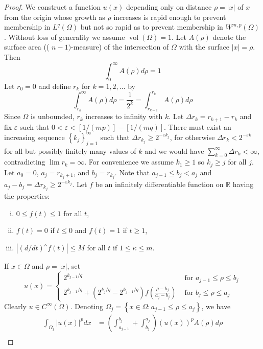 \begin{proof}
  We construct a function $u(x)$ depending only on distance $\rho=|x|$ of $x$ from the origin whose growth as $\rho$ increases is rapid enough to prevent membership in $L^q(\Omega)$ but not so rapid as to prevent membership in $W^{m, p}(\Omega)$.
  Without loss of generality we assume $\operatorname{vol}(\Omega)=1$. Let $A(\rho)$ denote the surface area (( $n-1)$-measure) of the intersection of $\Omega$ with the surface $|x|=\rho$. Then
  \[
  \int_0^{\infty} A(\rho) d \rho=1
  \]
  Let $r_0=0$ and define $r_k$ for $k=1,2, \ldots$ by
  \[
  \int_{r_k}^{\infty} A(\rho) d \rho=\frac{1}{2^k}=\int_{r_{k-1}}^{r_k} A(\rho) d \rho
  \]
  Since $\Omega$ is unbounded, $r_k$ increases to infinity with $k$. Let $\Delta r_k=r_{k+1}-r_k$ and fix $\varepsilon$ such that $0<\varepsilon<[1 /(m p)]-[1 /(m q)]$. There must exist an increasing sequence $\left\{k_j\right\}_{j=1}^{\infty}$ such that $\Delta r_{k_j} \geq 2^{-\varepsilon k_j}$, for otherwise $\Delta r_k<2^{-\varepsilon k}$ for all but possibly finitely many values of $k$ and we would have $\sum_{k=0}^{\infty} \Delta r_k<\infty$, contradicting $\lim r_k=\infty$. For convenience we assume $k_1 \geq 1$ so $k_j \geq j$ for all $j$. Let $a_0=0$, $a_j=r_{k_j+1}$, and $b_j=r_{k_j}$. Note that $a_{j-1} \leq b_j<a_j$ and $a_j-b_j=\Delta r_{k_j} \geq 2^{-\varepsilon k_j}$.
  Let $f$ be an infinitely differentiable function on $\mathbb{R}$ having the properties:
  \begin{enumerate}[(i)]
    \item $0 \leq f(t) \leq 1$ for all $t$,
    \item $f(t)=0$ if $t \leq 0$ and $f(t)=1$ if $t \geq 1$,
    \item $\left|(d / d t)^\kappa f(t)\right| \leq M$ for all $t$ if $1 \leq \kappa \leq m$.
  \end{enumerate}
  If $x \in \Omega$ and $\rho=|x|$, set
  \[
  u(x)= \begin{cases}2^{k_{j-1} / q} & \text { for } a_{j-1} \leq \rho \leq b_j \\ 2^{k_{j-1} / q}+\left(2^{k_j / q}-2^{k_{j-1} / q}\right) f\left(\frac{\rho-b_j}{a_j-b_j}\right) & \text { for } b_j \leq \rho \leq a_j\end{cases}
  \]
  Clearly $u \in C^{\infty}(\Omega)$. Denoting $\Omega_j=\left\{x \in \Omega: a_{j-1} \leq \rho \leq a_j\right\}$, we have
  \[
  \begin{aligned}
  \int_{\Omega_j}|u(x)|^p d x & =\left(\int_{a_{j-1}}^{b_j}+\int_{b_j}^{a_j}\right)(u(x))^p A(\rho) d \rho \\

\end{aligned}\]
\end{proof}
